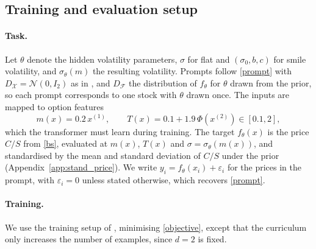 \subsection{Training and evaluation setup}
\vspace{-0.5em}
\label{sec:bs-setup}

  \paragraph{Task.}
  Let $\theta$ denote the hidden volatility parameters, $\sigma$ for flat and
  $(\sigma_0, b, c)$ for smile volatility, and $\sigma_\theta(m)$ the resulting volatility.
  Prompts follow \eqref{prompt} with $D_\mathcal{X} = \mathcal{N}(0, I_2)$ as in
  \cite{garg2022what}, and $D_\mathcal{F}$ the distribution of $f_\theta$ for $\theta$ drawn
  from the prior, so each prompt corresponds to one stock with $\theta$ drawn once. The
  inputs are mapped to option features
  \begin{equation}
    m(x) = 0.2\,x^{(1)}, \qquad T(x) = 0.1 + 1.9\,\Phi(x^{(2)}) \in [0.1, 2],
    \label{features}
  \end{equation}
  which the transformer must learn during training. The target $f_\theta(x)$ is the price
  $C/S$ from \eqref{bs}, evaluated at $m(x)$, $T(x)$ and $\sigma = \sigma_\theta(m(x))$, and
  standardised by the mean and standard deviation of $C/S$ under the prior
  (Appendix~\ref{app:stand_price}). We write $y_i = f_\theta(x_i) + \varepsilon_i$ for the
  prices in the prompt, with $\varepsilon_i = 0$ unless stated otherwise, which recovers
  \eqref{prompt}.

\vspace{-1em}
  \paragraph{Training.}
  We use the training setup of \cite{garg2022what}, minimising \eqref{objective}, except
  that the curriculum only increases the number of examples, since $d = 2$ is fixed.


